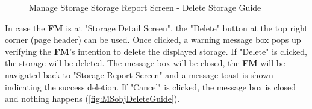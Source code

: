\begin{figure}[H]
	\centering
  
    \vspace{10pt}
    
  
    \vspace{10pt}
    

    \caption{Manage Storage Storage Report Screen - Delete Storage Guide}
	\label{fig:MSreportDeleteGuide}
\end{figure}


\bigskip
In case the \textbf{FM} is at "Storage Detail Screen", the "Delete" button at the top right corner (page header) can be used. 
Once clicked, a warning message box pops up verifying the \textbf{FM}'s intention to delete the displayed storage. If "Delete" is clicked, the storage will be deleted. The message box will be closed, the \textbf{FM} will be navigated back to "Storage Report Screen" and a message toast is shown indicating the success deletion. If "Cancel" is clicked, the message box is closed and nothing happens (\autoref{fig:MSobjDeleteGuide}).

